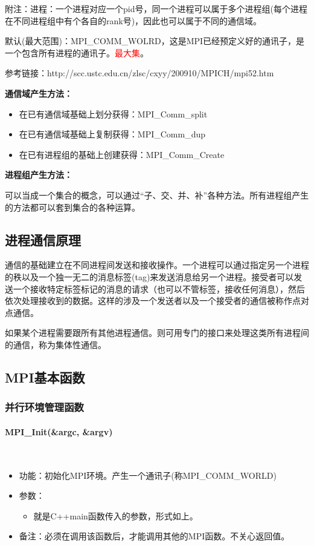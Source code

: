 \documentclass[UTF8]{article}%
\begin{document}
附注：进程：一个进程对应一个pid号，同一个进程可以属于多个进程组(每个进程在不同进程组中有个各自的rank号)，因此也可以属于不同的通信域。

默认(最大范围)：MPI\_COMM\_WOLRD，这是MPI已经预定义好的通讯子，是一个包含所有进程的通讯子。\textcolor{red}{最大集}。

参考链接：http://scc.ustc.edu.cn/zlsc/cxyy/200910/MPICH/mpi52.htm 


\textbf{通信域产生方法：}

\begin{itemize}
    \item 在已有通信域基础上划分获得：MPI\_Comm\_split
    \item 在已有通信域基础上复制获得：MPI\_Comm\_dup
    \item 在已有进程组的基础上创建获得：MPI\_Comm\_Create
\end{itemize}

\textbf{进程组产生方法：}

可以当成一个集合的概念，可以通过“子、交、并、补”各种方法。所有进程组产生的方法都可以套到集合的各种运算。

\subsection{进程通信原理}

通信的基础建立在不同进程间发送和接收操作。一个进程可以通过指定另一个进程的秩以及一个独一无二的消息标签(tag)来发送消息给另一个进程。接受者可以发送一个接收特定标签标记的消息的请求（也可以不管标签，接收任何消息），然后依次处理接收到的数据。这样的涉及一个发送者以及一个接受者的通信被称作点对点通信。

如果某个进程需要跟所有其他进程通信。则可用专门的接口来处理这类所有进程间的通信，称为集体性通信。

\subsection{MPI基本函数}

\subsubsection{并行环境管理函数}

\paragraph{MPI\_Init(\&argc, \&argv)}~{}

\begin{itemize}
    \item 功能：初始化MPI环境。产生一个通讯子(称MPI\_COMM\_WORLD)
    \item 参数：
    {
        \begin{itemize}
            \item 就是C++main函数传入的参数，形式如上。
        \end{itemize}
    }
    \item 备注：必须在调用该函数后，才能调用其他的MPI函数。不关心返回值。
\end{itemize}
\end{document}
